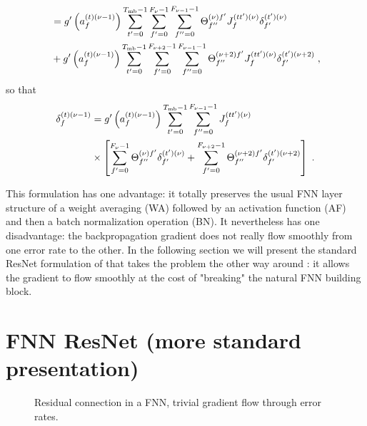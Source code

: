 \begin{subappendices}
\begin{align}
%
&=g'\left(a_{f}^{(t)(\nu-1)}\right)
%
\sum_{t'=0}^{T_{{\rm mb}}-1}\sum_{f'=0}^{F_{\nu}-1}\sum^{F_{\nu-1}-1}_{f''=0}\Theta^{(\nu)f'}_{f''}
%
J^{(tt')(\nu)}_{f} \delta^{(t')(\nu)}_{f'}\notag\\
%
&+g'\left(a_{f}^{(t)(\nu-1)}\right)
%
\sum_{t'=0}^{T_{{\rm mb}}-1}\sum_{f'=0}^{F_{\nu+2}-1}\sum^{F_{\nu-1}-1}_{f''=0}\Theta^{(\nu+2)f'}_{f''}
%
J^{(tt')(\nu)}_{f} \delta^{(t')(\nu+2)}_{f'}\;,
\end{align}
so that
\begin{align}
\delta^{(t)(\nu-1)}_f&=g'\left(a_{f}^{(t)(\nu-1)}\right)
%
\sum_{t'=0}^{T_{{\rm mb}}-1}\sum^{F_{\nu-1}-1}_{f''=0}J^{(tt')(\nu)}_{f}\notag\\
%
&\times\left[\sum_{f'=0}^{F_{\nu}-1}\Theta^{(\nu)f'}_{f''}\delta^{(t')(\nu)}_{f'}+
%
\sum_{f'=0}^{F_{\nu+2}-1}\Theta^{(\nu+2)f'}_{f''}\delta^{(t')(\nu+2)}_{f'}\right]\;.
\end{align}

This formulation has one advantage: it totally preserves the usual FNN layer structure of a weight averaging (WA) followed by an activation function (AF) and then a batch normalization operation (BN). It nevertheless has one disadvantage: the backpropagation gradient does not really flow smoothly from one error rate to the other. In the following section we will present the standard ResNet formulation of that takes the problem the other way around : it allows the gradient to flow smoothly at the cost of "breaking" the natural FNN building block. 

\section{FNN ResNet (more standard presentation)} \label{sec:ResnetFNN2}

\begin{figure}[H]
\begin{center}
\end{center}
\caption{\label{fig:fc_resnet_3} Residual connection in a FNN, trivial gradient flow through error rates.}
\end{figure}


\end{subappendices}
